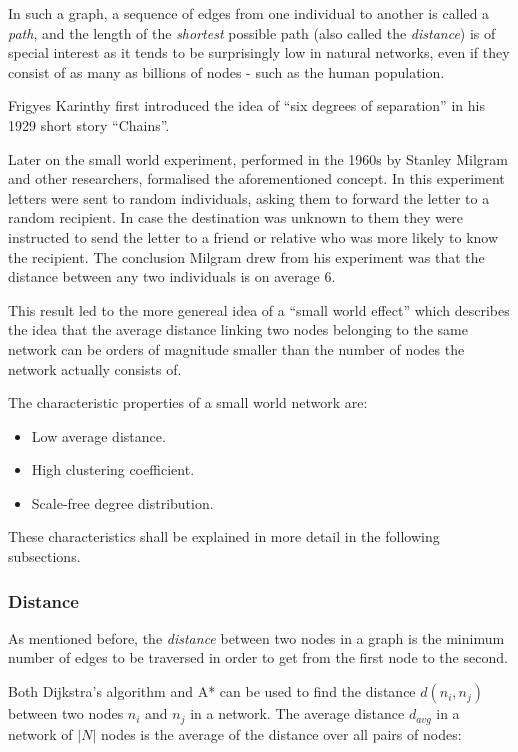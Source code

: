 \documentclass[a4paper,11pt,titlepage]{article}
\begin{document}
In such a graph, a sequence of edges from one individual to another is
called a \emph{path}, and the length of the \emph{shortest} possible path
(also called the \emph{distance}) is of special interest as it tends to
be surprisingly low in natural networks, even if they consist of as many
as billions of nodes - such as the human population.

Frigyes Karinthy first introduced the idea of ``six degrees of separation''
in his 1929 short story ``Chains''.

Later on the small world experiment, performed in the 1960s by
Stanley Milgram and other researchers, formalised the
aforementioned concept. In this experiment letters were
sent to random individuals, asking them to forward the letter to a
random recipient. In case the destination was unknown to them
they were instructed to send the letter to a friend or
relative who was more likely to know the recipient.
The conclusion Milgram drew from his experiment was that the
distance between any two individuals is on average $6$.

This result led to the more genereal idea of a ``small world effect'' which
describes the idea that the average distance linking two nodes belonging to
the same network can be orders of magnitude smaller than the number of nodes
the network actually consists of. \cite{complexAdapt}

The characteristic properties of a small world network are:

\begin{itemize}
  \item Low average distance.
  \item High clustering coefficient.
  \item Scale-free degree distribution.
\end{itemize}

These characteristics shall be explained in more detail in the following subsections.

\subsubsection{Distance}

As mentioned before, the \emph{distance} between two nodes in a graph
is the minimum number of edges to be traversed in order to get from
the first node to the second.

Both Dijkstra's algorithm and A* can be used to find the distance
$d(n_i, n_j)$ between two nodes $n_i$ and $n_j$ in a network. The
average distance $d_{avg}$ in a network of $|N|$ nodes is the average
of the distance over all pairs of nodes:
\end{document}
